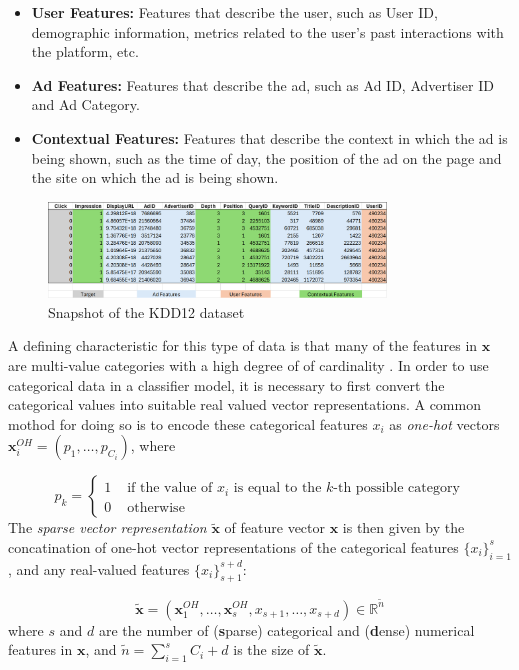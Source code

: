 \documentclass{mldsmsc}
\begin{document}
\begin{itemize}
\item \textbf{User Features:} Features that describe the user, such as User ID, demographic information,
metrics related to the user's past interactions with the platform, etc.
\item \textbf{Ad Features:} Features that describe the ad, such as Ad ID, Advertiser ID and Ad Category.
\item \textbf{Contextual Features:} Features that describe the context in which the ad is being shown, such as
the time of day, the position of the ad on the page and the site on which the ad is being shown.
\end{itemize}

\begin{figure}[h]
\centering
\includegraphics[width=0.8\textwidth]{../figures/kdd12_snapshot.png}
\caption{Snapshot of the KDD12 dataset \citep{RefWorks:aden2012kdd}}
\label{fig:kdd12-snapshot}
\end{figure}

A defining characteristic for this type of data is that many of the features in $\mathbf{x}$ are multi-value categories with 
a high degree of of cardinality \citep{RefWorks:he2017neural}. In order to use categorical data
in a classifier model, it is necessary to first convert the categorical values into suitable real valued vector representations.
A common mothod for doing so is to encode these categorical features $x_i$
as \emph{one-hot} vectors $\mathbf{x}_i^{OH} = \left(p_1, \ldots, p_{C_i} \right)$, where

\[
p_k =
\begin{cases}
    1 & \text{ if the value of } x_i \text{ is equal to the } k \text{-th possible category}\\
    0 & \text{ otherwise}
\end{cases}
\]
The \emph{sparse vector representation} $\tilde{\mathbf{x}}$ of feature vector $\mathbf{x}$
is then given by the concatination of one-hot vector representations of the categorical features $\{x_i\}_{i=1}^{s}$,
and any real-valued features $\{x_i\}_{s+1}^{s+d}$:

\begin{equation}
    \label{eqn:sparse-vector}
    \tilde{\mathbf{x}} = \left( \mathbf{x}_1^{OH}, \ldots, \mathbf{x}_s^{OH}, x_{s+1}, \ldots, x_{s+d}\right) \in \mathbb{R}^{\tilde{n}}
\end{equation}
where $s$ and $d$ are the number of (\textbf{s}parse) categorical and (\textbf{d}ense) numerical
features in $\mathbf{x}$, and $\tilde{n} = \sum_{i=1}^{s}C_i + d$ is the size of $\tilde{\mathbf{x}}$.
\end{document}
